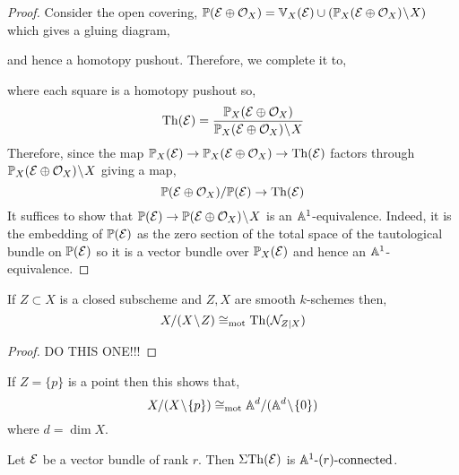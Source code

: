 \documentclass[12pt]{article}
\begin{document}
\begin{proof}
Consider the open covering, $\mathbb{P}(\mathcal{E} \oplus \mathcal{O}_{X}) = \mathbb{V}_X(\mathcal{E}) \cup (\mathbb{P}_X(\mathcal{E} \oplus \mathcal{O}_{X}) \! \setminus \! X)$ which gives a gluing diagram,
\begin{center}
\end{center}
and hence a homotopy pushout. Therefore, we complete it to, 
\begin{center}
\end{center}
where each square is a homotopy pushout so,
\[ \mathrm{Th}(\mathcal{E}) = \frac{\mathbb{P}_X(\mathcal{E} \oplus \mathcal{O}_{X})}{\mathbb{P}_X(\mathcal{E} \oplus \mathcal{O}_{X}) \! \setminus \! X} \]
Therefore, since the map $\mathbb{P}_X(\mathcal{E}) \to \mathbb{P}_X(\mathcal{E} \oplus \mathcal{O}_{X}) \to \mathrm{Th}(\mathcal{E})$ factors through $\mathbb{P}_X(\mathcal{E} \oplus \mathcal{O}_{X}) \! \setminus \! X$ giving a map,
\[ \mathbb{P}(\mathcal{E} \oplus \mathcal{O}_{X}) / \mathbb{P}(\mathcal{E}) \to \mathrm{Th}(\mathcal{E}) \]
It suffices to show that $\mathbb{P}(\mathcal{E}) \to \mathbb{P}(\mathcal{E} \oplus \mathcal{O}_{X}) \! \setminus \! X$ is an $\mathbb{A}^1$-equivalence. Indeed, it is the embedding of $\mathbb{P}(\mathcal{E})$ as the zero section of the total space of the tautological bundle on $\mathbb{P}(\mathcal{E})$ so it is a vector bundle over $\mathbb{P}_X(\mathcal{E})$ and hence an $\mathbb{A}^1$-equivalence.  
\end{proof}

\begin{lemma}
If $Z \subset X$ is a closed subscheme and $Z, X$ are smooth $k$-schemes then,
\[ X / (X \! \setminus \! Z) \cong_{\text{mot}} \mathrm{Th}( \mathcal{N}_{Z | X} )\]
\end{lemma}

\begin{proof}
DO THIS ONE!!!
\end{proof}

\begin{example}
If $Z = \{ p \}$ is a point then this shows that,
\[ X / (X \! \setminus \! \{ p \}) \cong_{\text{mot}} \mathbb{A}^d / (\mathbb{A}^d \! \setminus \! \{ 0 \}) \]
where $d = \dim{X}$. 
\end{example}


\begin{lemma}
Let $\mathcal{E}$ be a vector bundle of rank $r$. Then $\Sigma \mathrm{Th}(\mathcal{E})$ is $\mathbb{A}^1\text{-}(r)\text{-connected}$. 
\end{lemma}
\end{document}
